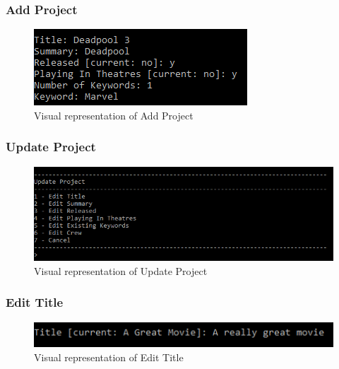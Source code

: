 \documentclass[
  english,
  a4paper,
,tablecaptionabove
]{scrartcl}
\begin{document}
\hypertarget{add-project}{%
\subsubsection{Add Project}\label{add-project}}

\begin{figure}
\centering
\includegraphics{images/ui-screenshots/add-project.png}
\caption{Visual representation of Add Project}
\end{figure}

\newpage

\hypertarget{update-project}{%
\subsubsection{Update Project}\label{update-project}}

\begin{figure}
\centering
\includegraphics{images/ui-screenshots/update-project.png}
\caption{Visual representation of Update Project}
\end{figure}

\newpage

\hypertarget{edit-title}{%
\subsubsection{Edit Title}\label{edit-title}}

\begin{figure}
\centering
\includegraphics{images/ui-screenshots/update-title.png}
\caption{Visual representation of Edit Title}
\end{figure}
\end{document}
